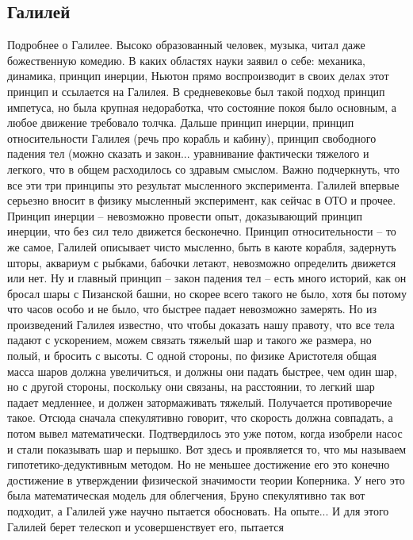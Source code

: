 \documentclass[a4paper, 12pt]{article}
\begin{document}
\subsection{Галилей}

Подробнее о Галилее. Высоко образованный человек, музыка, читал даже 
божественную комедию. В каких областях науки заявил о себе: механика, 
динамика, принцип инерции, Ньютон прямо воспроизводит в своих делах этот 
принцип и ссылается на Галилея. В средневековье был такой подход принцип 
импетуса, но была крупная недоработка, что состояние покоя было 
основным, а любое движение требовало толчка. Дальше принцип инерции, 
принцип относительности Галилея (речь про корабль и кабину), принцип 
свободного падения тел (можно сказать и закон... уравнивание фактически 
тяжелого и легкого, что в общем расходилось со здравым смыслом. Важно 
подчеркнуть, что все эти три принципы это результат мысленного 
эксперимента. Галилей впервые серьезно вносит в физику мысленный 
эксперимент, как сейчас в ОТО и прочее. Принцип инерции -- невозможно 
провести опыт, доказывающий принцип инерции, что без сил тело движется 
бесконечно. Принцип относительности -- то же самое, Галилей описывает 
чисто мысленно, быть в каюте корабля, задернуть шторы, аквариум 
с рыбками, бабочки летают, невозможно определить движется или нет. Ну 
и главный принцип -- закон падения тел -- есть много историй, как он 
бросал шары с Пизанской башни, но скорее всего такого не было, хотя бы 
потому что часов особо и не было, что быстрее падает невозможно 
замерять. Но из произведений Галилея известно, что чтобы доказать нашу 
правоту, что все тела падают с ускорением, можем связать тяжелый шар 
и такого же размера, но полый, и бросить с высоты. С одной стороны, по 
физике Аристотеля общая масса шаров должна увеличиться, и должны они 
падать быстрее, чем один шар, но с другой стороны, поскольку они 
связаны, на расстоянии, то легкий шар падает медленнее, и должен 
затормаживать тяжелый. Получается противоречие такое. Отсюда сначала 
спекулятивно говорит, что скорость должна совпадать, а потом вывел 
математически. Подтвердилось это уже потом, когда изобрели насос и стали 
показывать шар и перышко. Вот здесь и проявляется то, что мы называем 
гипотетико-дедуктивным методом. Но не меньшее достижение его это конечно 
достижение в утверждении физической значимости теории Коперника. У него 
это была математическая модель для облегчения, Бруно спекулятивно так 
вот подходит, а Галилей уже научно пытается обосновать. На опыте... 
И для этого Галилей берет телескоп и усовершенствует его, пытается 
\end{document}
